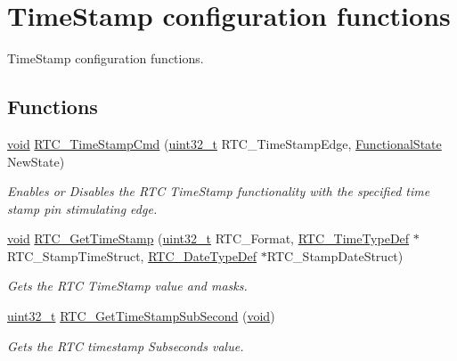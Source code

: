 \hypertarget{group___r_t_c___group8}{\section{Time\-Stamp configuration functions}
\label{group___r_t_c___group8}
}


Time\-Stamp configuration functions.  


\subsection*{Functions}
\begin{DoxyCompactItemize}
\item 
\hyperlink{group___n_a_m_e_ga18028b8badbf1ea7e704ccac3c488e82}{void} \hyperlink{group___r_t_c___group8_ga7d80fa4a2c87654598d8207154ac8e96}{R\-T\-C\-\_\-\-Time\-Stamp\-Cmd} (\hyperlink{stdint_8h_a435d1572bf3f880d55459d9805097f62}{uint32\-\_\-t} R\-T\-C\-\_\-\-Time\-Stamp\-Edge, \hyperlink{group___exported__types_gac9a7e9a35d2513ec15c3b537aaa4fba1}{Functional\-State} New\-State)
\begin{DoxyCompactList}\small\item\em Enables or Disables the R\-T\-C Time\-Stamp functionality with the specified time stamp pin stimulating edge. \end{DoxyCompactList}\item 
\hyperlink{group___n_a_m_e_ga18028b8badbf1ea7e704ccac3c488e82}{void} \hyperlink{group___r_t_c___group8_ga44c38b0c74e9e960a4263b2905f44796}{R\-T\-C\-\_\-\-Get\-Time\-Stamp} (\hyperlink{stdint_8h_a435d1572bf3f880d55459d9805097f62}{uint32\-\_\-t} R\-T\-C\-\_\-\-Format, \hyperlink{struct_r_t_c___time_type_def}{R\-T\-C\-\_\-\-Time\-Type\-Def} $\ast$R\-T\-C\-\_\-\-Stamp\-Time\-Struct, \hyperlink{struct_r_t_c___date_type_def}{R\-T\-C\-\_\-\-Date\-Type\-Def} $\ast$R\-T\-C\-\_\-\-Stamp\-Date\-Struct)
\begin{DoxyCompactList}\small\item\em Gets the R\-T\-C Time\-Stamp value and masks. \end{DoxyCompactList}\item 
\hyperlink{stdint_8h_a435d1572bf3f880d55459d9805097f62}{uint32\-\_\-t} \hyperlink{group___r_t_c___group8_ga2b0ef81f4959a2f9fc6361fbda759b00}{R\-T\-C\-\_\-\-Get\-Time\-Stamp\-Sub\-Second} (\hyperlink{group___n_a_m_e_ga18028b8badbf1ea7e704ccac3c488e82}{void})
\begin{DoxyCompactList}\small\item\em Gets the R\-T\-C timestamp Subseconds value. \end{DoxyCompactList}\end{DoxyCompactItemize}


